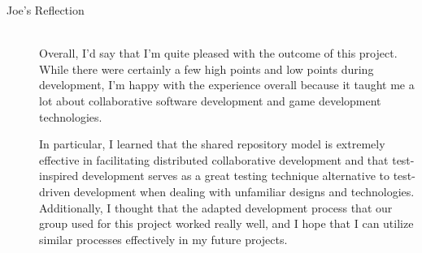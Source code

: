 \documentclass{article}
\begin{document}
\begin{description}
			\item[Joe's Reflection] \hfill \\
			Overall, I'd say that I'm quite pleased with the outcome of this
			project.  While there were certainly a few high points and low points
			during development, I'm happy with the experience overall because it
			taught me a lot about collaborative software development and game 
			development technologies.  
			
			In particular, I learned that the shared repository model is extremely 
			effective in facilitating distributed collaborative development and 
			that test-inspired development serves as a great testing technique 
			alternative to test-driven development when dealing with unfamiliar 
			designs and technologies.  Additionally, I thought that the adapted 
			development process that our group used for this project worked really 
			well, and I hope that I can utilize similar processes effectively 
			in my future projects.  		
	\end{description}
\end{document}
